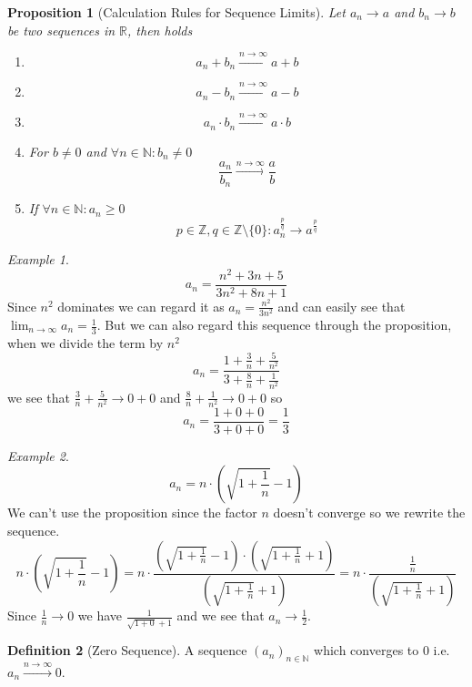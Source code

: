\documentclass[english,titlepage]{uzhpub}
\theoremstyle{definition}
\newtheorem{definition}{Definition}[section]
\theoremstyle{plain}
\newtheorem{proposition}[definition]{Proposition}
\theoremstyle{remark}
\theoremstyle{example}
\newtheorem*{example}{Example}
\begin{document}
   \begin{proposition}[Calculation Rules for Sequence Limits]\label{pro:R_field_operations}
      Let \(a_n \to a\) and \(b_n \to b\) be two sequences in \(\mathbb{R}\), then holds
      \begin{enumerate}[label=\roman*, align=Center]
         \item \[a_n + b_n \xrightarrow{n \to \infty} a + b\]
         \item \[a_n - b_n \xrightarrow{n \to \infty} a - b\]
         \item \[a_n \cdot b_n \xrightarrow{n \to \infty} a \cdot b\]
         \item For \(b \neq 0\) and \(\forall n \in \mathbb{N}: b_n \neq 0\)
            \[\frac{a_n}{b_n} \xrightarrow{n \to \infty} \frac{a}{b}\]
         \item If \(\forall n \in \mathbb{N}: a_n \geq 0\)
            \[p \in \mathbb{Z}, q \in \mathbb{Z} \setminus \{0\}: a_n^{\frac{p}{q}} \to a^{\frac{p}{q}}\]
      \end{enumerate}
   \end{proposition}
   \begin{example}
      \[a_n = \frac{n^2 + 3n + 5}{3n^2 + 8n + 1}\]
      Since \(n^2\) dominates we can regard it as \(a_n = \frac{n^2}{3n^2}\) and can easily see that \(\lim_{n \to \infty} a_n = \frac{1}{3}\).
      But we can also regard this sequence through the proposition, when we divide the term by \(n^2\)
      \[a_n = \frac{1 + \frac{3}{n} + \frac{5}{n^2}}{3 + \frac{8}{n} + \frac{1}{n^2}}\]
      we see that \(\frac{3}{n} + \frac{5}{n^2}  \to 0 + 0\) and \(\frac{8}{n} + \frac{1}{n^2} \to 0 + 0\) so
      \[a_n = \frac{1 + 0 + 0}{3 + 0 + 0} = \frac{1}{3}\]
   \end{example}
   \begin{example}
      \[a_n = n \cdot \left(\sqrt{1 + \frac{1}{n}} - 1\right)\]
      We can't use the proposition since the factor \(n\) doesn't converge so we rewrite the sequence.
      \[n \cdot \left(\sqrt{1 + \frac{1}{n}} - 1\right) = n \cdot \frac{\left(\sqrt{1 + \frac{1}{n}} - 1\right) \cdot \left(\sqrt{1 + \frac{1}{n}} + 1\right)}{\left(\sqrt{1 + \frac{1}{n}} + 1\right)} = n \cdot \frac{\frac{1}{n}}{\left(\sqrt{1 + \frac{1}{n}} + 1\right)}\]
      Since \(\frac{1}{n} \to 0\) we have \(\frac{1}{\sqrt{1 + 0} + 1}\) and we see that \(a_n \to \frac{1}{2}\).
   \end{example}

   \begin{definition}[Zero Sequence]
      A sequence \((a_n)_{n \in \mathbb{N}}\) which converges to 0 i.e. \(a_n \xrightarrow{n \to \infty} 0\).
   \end{definition}
\end{document}
